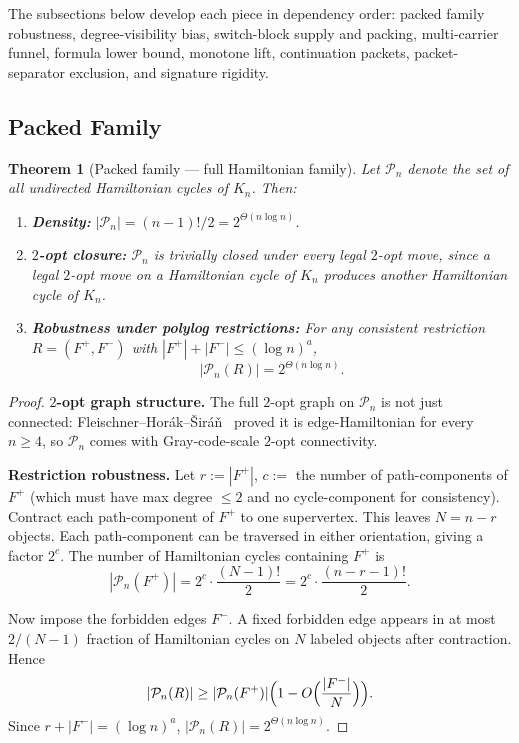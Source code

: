 \documentclass[11pt]{article}
\newtheorem{theorem}{Theorem}[section]
\begin{document}
\medskip

The subsections below develop each piece in dependency order: packed
family robustness, degree-visibility bias, switch-block supply and
packing, multi-carrier funnel, formula lower bound, monotone lift,
continuation packets, packet-separator exclusion, and signature
rigidity.

\subsection{Packed Family}

\begin{theorem}[Packed family --- full Hamiltonian family]
\label{thm:packed-family}
Let $\mathcal{P}_n$ denote the set of all undirected
Hamiltonian cycles of $K_n$. Then:
\begin{enumerate}
\item \textbf{Density:}
$|\mathcal{P}_n| = (n-1)!/2 = 2^{\Theta(n \log n)}$.

\item \textbf{$2$-opt closure:}
$\mathcal{P}_n$ is trivially closed under every legal
$2$-opt move, since a legal $2$-opt move on a Hamiltonian
cycle of $K_n$ produces another Hamiltonian cycle of $K_n$.

\item \textbf{Robustness under polylog restrictions:}
For any consistent restriction $R = (F^+, F^-)$ with
$|F^+| + |F^-| \le (\log n)^a$,
\[
|\mathcal{P}_n(R)| = 2^{\Theta(n \log n)}.
\]
\end{enumerate}
\end{theorem}

\begin{proof}
\textbf{$2$-opt graph structure.}
The full $2$-opt graph on $\mathcal{P}_n$ is not just
connected: Fleischner--Hor\'ak--\v{S}ir\'a\v{n}~\cite{FHS07} proved it is
edge-Hamiltonian for every $n \ge 4$, so $\mathcal{P}_n$
comes with Gray-code-scale $2$-opt connectivity.

\textbf{Restriction robustness.}
Let $r := |F^+|$, $c :=$ the number of path-components
of $F^+$ (which must have max degree $\le 2$ and no
cycle-component for consistency).
Contract each path-component of $F^+$ to one supervertex.
This leaves $N = n - r$ objects. Each path-component can
be traversed in either orientation, giving a factor $2^c$.
The number of Hamiltonian cycles containing $F^+$ is
\[
|\mathcal{P}_n(F^+)| = 2^c \cdot \frac{(N-1)!}{2}
= 2^c \cdot \frac{(n - r - 1)!}{2}.
\]

Now impose the forbidden edges $F^-$. A fixed forbidden
edge appears in at most $2/(N-1)$ fraction of Hamiltonian
cycles on $N$ labeled objects after contraction. Hence
\[
|\mathcal{P}_n(R)| \ge |\mathcal{P}_n(F^+)|
\Bigl(1 - O\Bigl(\frac{|F^-|}{N}\Bigr)\Bigr).
\]
Since $r + |F^-| = (\log n)^a$,
$|\mathcal{P}_n(R)| = 2^{\Theta(n \log n)}$.
\end{proof}
\end{document}
